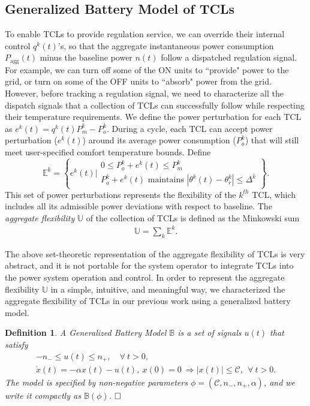 \documentclass[onecolumn,journal]{IEEEtran}
\newtheorem{definition}{Definition}
\begin{document}
\subsection{Generalized Battery Model of \acp{TCL}}\label{sec:battery}
To enable TCLs to provide regulation service, we can override their internal control $q^k(t)$'s, so that the aggregate instantaneous power consumption $P_{\textrm{agg}}(t)$ minus the baseline power $n(t)$ follow a dispatched regulation signal. For example, we can turn off some of the ON units to ``provide" power to the grid, or  turn on some of the OFF units to ``absorb" power from the grid. However, before tracking a regulation signal, we need to characterize all the dispatch signals that a collection of TCLs can successfully follow while respecting their temperature requirements. We define the power perturbation for each TCL as $e^k(t)=q^k(t) P_m^k -P_o^k$. During a cycle, each \ac{TCL} can accept power perturbation ($e^{k}(t)$) around its average power consumption ($P_{o}^{k}$) that will still meet user-specified comfort temperature bounds.
Define 
\[ \mathbb{E}^k = \left\{ e^k(t) \Big | \begin{matrix}  0 \leq P_{o}^{k} + e^{k}(t)  \leq P_{m}^{k} \\ P_o^k +e^k(t) \text{ maintains } |\theta^k(t) - \theta_r^k| \leq \Delta^k
 \end{matrix} \right\}. 
 \]
This set of power perturbations represents the flexibility of the $k^{th}$ TCL, which includes all its admissible power deviations with respect to baseline.
The \emph{aggregate flexibility} $\mathbb{U}$ of the collection of TCLs is defined as the Minkowski sum
\begin{align*}
\mathbb{U} = \sum_k \mathbb{E}^k.
\end{align*}

The above set-theoretic representation of the aggregate flexibility of \acp{TCL} is very abstract, and it is not portable for the system operator to integrate \acp{TCL} into the power system operation and control. In order to represent the aggregate flexibility $\mathbb{U}$ in a simple, intuitive, and meaningful way, we characterized the aggregate flexibility of TCLs in our previous work \cite{hehao2013generalized, HH_BS_KP_TV_TPS_2013} using a generalized battery model. 
\begin{definition}
A \emph{Generalized Battery Model} $\mathbb{B}$ is a set of signals $u(t)$ that satisfy
\begin{align*}
-n_- \leq u(t) \leq n_+, \quad \forall \ t>0, \qquad \qquad \\
\dot{x}(t) = - \alpha x(t) - u(t), \ x(0) = 0 \  \Rightarrow |x(t)| \leq \mathcal{C}, \ \ \forall \ t>0.
\end{align*} 
The model is specified by non-negative parameters $\phi = ( \mathcal{C}, n_-, n_+, \alpha)$,  and we write it compactly as $\mathbb{B}(\phi)$. $\hfill \square$
\label{def:battery}
\end{definition}
\end{document}
